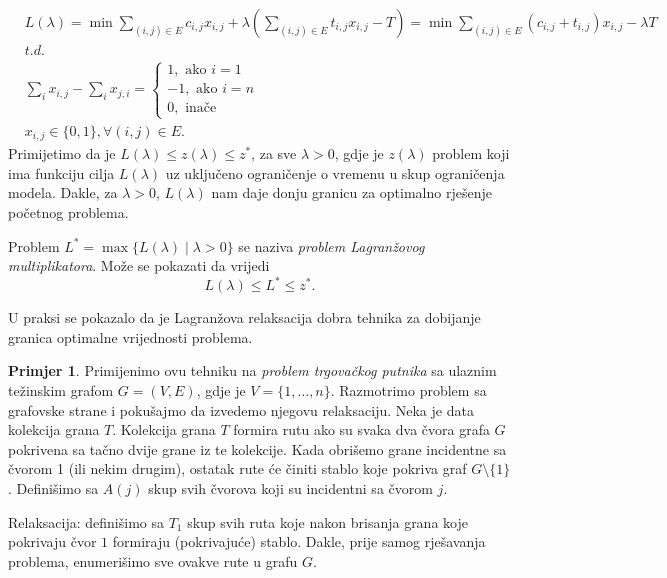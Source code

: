 \documentclass[a4paper, utf8, 11pt, colorlinks]{book}
\theoremstyle{definition}
\newtheorem{primjer}{Primjer}[chapter]
\begin{document}
\begin{align*}
       &L(\lambda)= \min\sum_{(i,j) \in E }c_{i,j}x_{i,j}  + \lambda(\sum_{(i,j) \in E} t_{i,j} x_{i,j} - T ) = \min \sum_{(i,j) \in E} (c_{i,j} + t_{i,j} )x_{i,j} - \lambda T \\
        &{t.d. }\\
    & \sum_{i} x_{i,j} - \sum_{i} x_{j,i} = \begin{cases}  
                                               1, \mbox{ ako } i=1 \\
                                              -1, \mbox{ ako } i=n \\
                                               0, \mbox{ inače }
                                            \end{cases} \\
     & x_{i,j} \in \{0, 1 \}, \forall (i,j) \in E.
\end{align*}
Primijetimo da je $L(\lambda) \leq z(\lambda)  \leq z^*$, za sve $\lambda > 0$, gdje je $z(\lambda)$ problem koji ima funkciju cilja $L(\lambda)$ uz uključeno ograničenje o vremenu u skup ograničenja modela. Dakle, za $\lambda >0$, $L(\lambda)$ nam daje donju granicu za optimalno rješenje početnog problema. 

Problem $L^* = \max \{ L(\lambda) \mid \lambda > 0  \}$ se naziva \emph{problem Lagranžovog multiplikatora}. Može se pokazati da vrijedi 
$$ L(\lambda) \leq L^* \leq z^*.$$

U praksi se pokazalo da je Lagranžova relaksacija dobra tehnika za dobijanje granica optimalne vrijednosti problema. 
 
\begin{primjer}
Primijenimo ovu tehniku na \emph{problem trgovačkog putnika} sa ulaznim težinskim grafom $G=(V,E)$, gdje je $V=\{1, \ldots, n\}$.  Razmotrimo  problem sa grafovske strane i pokušajmo da izvedemo njegovu relaksaciju. Neka je data kolekcija grana $T$. Kolekcija grana $T$ formira rutu ako su svaka dva čvora grafa $G$ pokrivena sa tačno dvije grane iz te kolekcije. Kada obrišemo grane incidentne sa čvorom 1 (ili nekim drugim), ostatak rute će činiti stablo koje pokriva graf  $G\setminus \{1\}$.  
Definišimo sa $A(j)$ skup svih čvorova koji su incidentni sa čvorom $j$. 
\end{primjer}
Relaksacija: definišimo sa $T_1$ skup svih ruta koje nakon brisanja grana koje pokrivaju čvor $1$ formiraju (pokrivajuće) stablo.  Dakle, prije samog rješavanja problema, enumerišimo sve ovakve rute u grafu $G$. 
\end{document}
